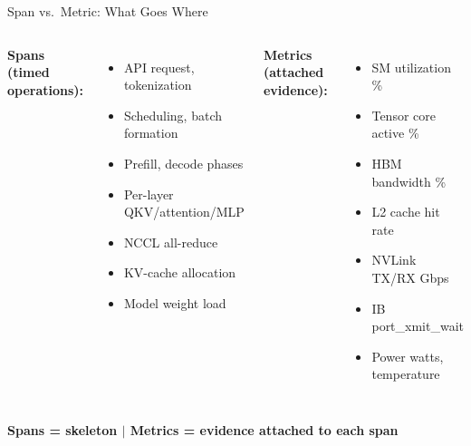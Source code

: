\documentclass[aspectratio=169,10pt]{beamer}
\begin{document}
\begin{frame}{Span vs.\ Metric: What Goes Where}
\begin{columns}[T]
\textbf{Spans (timed operations):}
\begin{itemize}\small
\item API request, tokenization
\item Scheduling, batch formation
\item Prefill, decode phases
\item Per-layer QKV/attention/MLP
\item NCCL all-reduce
\item KV-cache allocation
\item Model weight load
\end{itemize}

\textbf{Metrics (attached evidence):}
\begin{itemize}\small
\item SM utilization \%
\item Tensor core active \%
\item HBM bandwidth \%
\item L2 cache hit rate
\item NVLink TX/RX Gbps
\item IB port\_xmit\_wait
\item Power watts, temperature
\end{itemize}
\end{columns}
\vspace{0.5em}
\centering
\textcolor{t1}{\textbf{Spans = skeleton $|$ Metrics = evidence attached to each span}}
\end{frame}
\end{document}
